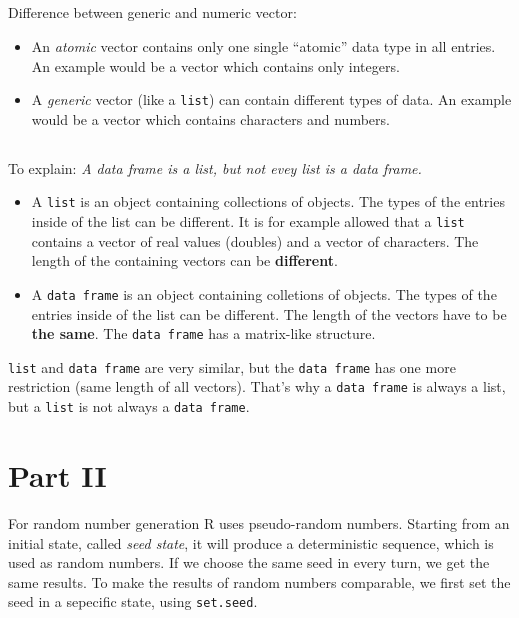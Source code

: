 \documentclass{article}
\begin{document}
\subsection{}

Difference between generic and numeric vector:

\begin{itemize}
\item An \emph{atomic} vector contains only one single ``atomic'' data type in all entries. An example would be a vector which contains only integers.
\item A \emph{generic} vector (like a \texttt{list}) can contain different types of data. An example would be a vector which contains characters and numbers.
\end{itemize}

\subsection{}

To explain: \emph{A data frame is a list, but not evey list is a data frame.}

\begin{itemize}
\item A \texttt{list} is an object containing collections of objects. The types of the entries inside of the list can be different. It is for example allowed that a \texttt{list} contains a vector of real values (doubles) and a vector of characters. The length of the containing vectors can be \textbf{different}.
\item A \texttt{data frame} is an object containing colletions of objects. The types of the entries inside of the list can be different. The length of the vectors have to be \textbf{the same}. The \texttt{data frame} has a matrix-like structure.
\end{itemize}

\texttt{list} and \texttt{data frame} are very similar, but the \texttt{data frame} has one more restriction (same length of all vectors). That's why a \texttt{data frame} is always a list, but a \texttt{list} is not always a \texttt{data frame}.

\section{Part II}

For random number generation R uses pseudo-random numbers. Starting from an initial state, called \emph{seed state}, it will produce a deterministic sequence, which is used as random numbers. If we choose the same seed in every turn, we get the same results. To make the results of random numbers comparable, we first set the seed in a sepecific state, using \texttt{set.seed}.
\end{document}
